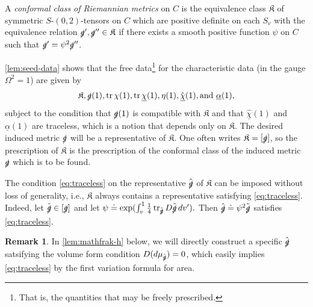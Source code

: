 \documentclass[10pt]{article}
\numberwithin{equation}{section}
\theoremstyle{plain}
\theoremstyle{definition}
\newtheorem{rk}{Remark}[section]
\newcommand{\tr}{\operatorname{tr}}
\begin{document}
 A \emph{conformal class of Riemannian metrics} on $C$ is the equivalence class $\mathfrak K$ of symmetric $S$-$(0,2)$-tensors on $C$ which are positive definite on each $S_v$ with the equivalence relation ${\slashed g}{}',{\slashed g}''\in \mathfrak K$ if there exists a smooth positive function $\psi$ on $C$ such that ${\slashed g}'=\psi^2{\slashed g}''$.

\cref{lem:seed-data} shows that the free data\footnote{That is, the quantities that may be freely prescribed.} for the characteristic data (in the gauge $\Omega^2=1$) are given by 
\begin{equation*}
    \mathfrak K, \slashed g(1), \tr\chi(1),\tr\underline\chi(1), \eta(1), \hat{\underline\chi}(1), \text{and }\underline\alpha(1),
\end{equation*}
subject to the condition that $\slashed g(1)$ is compatible with $\mathfrak K$ and that $\hat{\underline\chi}(1)$ and $\underline\alpha(1)$ are traceless, which is a notion that depends only on $\mathfrak K$. The desired induced metric $\slashed g$ will be a representative of $\mathfrak K$. One often writes $\mathfrak K=[\slashed g]$, so the prescription of $\mathfrak K$ is the prescription of the conformal class of the induced metric $\slashed g$ which is to be found. 

The condition \eqref{eq:traceless} on the representative $\hat{\slashed g}$ of $\mathfrak K$ can be imposed without loss of generality, i.e., $\mathfrak K$ always contains a representative satisfying \eqref{eq:traceless}. Indeed, let $\tilde{\slashed g}\in[\slashed g]$ and let $\psi\doteq \exp(\int_v^1 \tfrac 14\tr_{\tilde{\slashed g}}D\tilde{\slashed g}\,dv').$ Then $\hat{\slashed g}\doteq \psi^2\tilde{\slashed g}$ satisfies \eqref{eq:traceless}. 

\begin{rk}
In \cref{lem:mathfrak-h} below, we will directly construct a specific $\hat{\slashed g}$ satsifying the volume form condition $D(d\mu_{\hat{\slashed g}})=0$, which easily implies \eqref{eq:traceless} by the first variation formula for area.
\end{rk}
\end{document}
